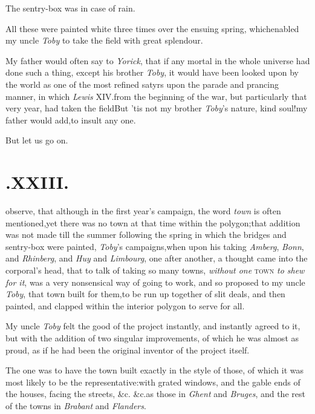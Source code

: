 \documentclass{article}
\begin{document}
\tsh The sentry-box was in case of rain.

All these were painted white three times over the ensuing
spring, which\break enabled my uncle \textit{Toby} to take the field with
great splendour.

My father would often say to \textit{Yorick}, that if any mortal
in the whole universe
had done such a thing, except his bro\-ther \textit{Toby}, it
would have been looked upon by the world as one of the most
refined satyrs upon the parade and prancing manner, in which
\textit{Lewis} XIV.\@ from the beginning of the war, but
particularly that very year, had taken the field\break\tsh But ’tis
not my brother \textit{Toby}’s nature, kind soul!\@ my father
would add,\break to insult any one.

\tsh But let us go on.

\section{.\enspace XXIII.}

 observe, that although in the first year’s
campaign, the word \textit{town} is often mentioned,\tsk yet there was no
town at that time within the polygon;\break that addition was not made
till the summer following the spring in which the bridges and
sentry-box were painted,
\textit{Toby}’s campaigns,\tsk when upon his taking
\textit{Amberg}, \textit{Bonn}, and \textit{Rhinberg}, and \textit{Huy}
and \textit{Limbourg}, one after another, a thought came into
the corporal’s head, that to talk of taking so many towns,
\textit{without one} \textsc{town} \textit{to shew for it},\tsk
was a very nonsensical way of going to work, and so proposed to
my uncle \textit{Toby}, that 
town built for them,\tsk to be run up together of slit deals,
and then painted, and clapped within the interior polygon to
serve for all.

My uncle \textit{Toby} felt the good of the project instantly, and
instantly agreed to it, but with the addition of two singular
improvements, of which he was almost as proud, as if he had been the
original inventor of the project itself.

The one was to have the town built exactly in the style of
those, of which it was most likely to be the
representative:\break\tsh with grated windows, and the gable
ends of the houses, facing the streets, \&c. \&c.\tsk as
those in \textit{Ghent} and\break
\textit{Bruges}, and the rest of the towns in\break
\textit{Brabant} and \textit{Flanders}.
\end{document}
